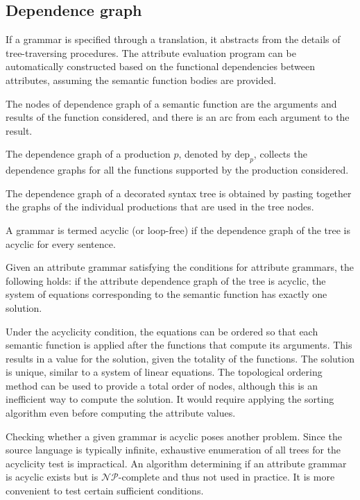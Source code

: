 \subsection{Dependence graph}
If a grammar is specified through a translation, it abstracts from the details of tree-traversing procedures. 
The attribute evaluation program can be automatically constructed based on the functional dependencies between attributes, assuming the semantic function bodies are provided.
\begin{definition}
    The nodes of dependence graph of a semantic function are the arguments and results of the function considered, and there is an arc from each argument to the result.
\end{definition}
\begin{definition}
    The dependence graph of a production $p$, denoted by $\text{dep}_p$, collects the dependence graphs for all the functions supported by the production considered.
\end{definition}
\begin{definition}
    The dependence graph of a decorated syntax tree is obtained by pasting together the graphs of the individual productions that are used in the tree nodes.
\end{definition}
A grammar is termed acyclic (or loop-free) if the dependence graph of the tree is acyclic for every sentence.
\begin{property}
    Given an attribute grammar satisfying the conditions for attribute grammars, the following holds: if the attribute dependence graph of the tree is acyclic, the system of equations corresponding to the semantic function has exactly one solution.
\end{property}
Under the acyclicity condition, the equations can be ordered so that each semantic function is applied after the functions that compute its arguments. 
This results in a value for the solution, given the totality of the functions. 
The solution is unique, similar to a system of linear equations. 
The topological ordering method can be used to provide a total order of nodes, although this is an inefficient way to compute the solution. 
It would require applying the sorting algorithm even before computing the attribute values.

Checking whether a given grammar is acyclic poses another problem. 
Since the source language is typically infinite, exhaustive enumeration of all trees for the acyclicity test is impractical. 
An algorithm determining if an attribute grammar is acyclic exists but is $\mathcal{NP}$-complete and thus not used in practice. 
It is more convenient to test certain sufficient conditions.

